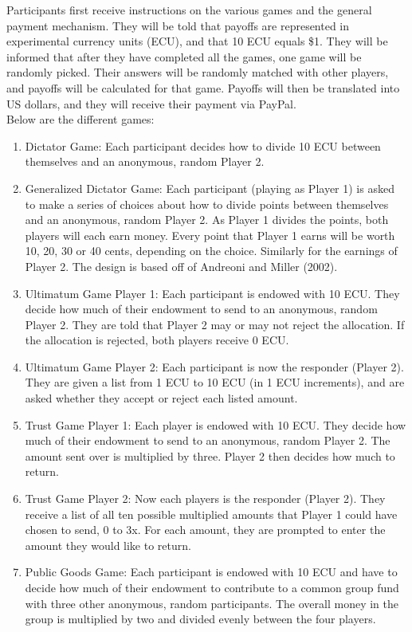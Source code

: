 \documentclass{article}
\begin{document}
Participants first receive instructions on the various games and the general payment mechanism. They will be told that payoffs are represented in experimental currency units (ECU), and that 10 ECU equals \$1. They will be informed that after they have completed all the games, one game will be randomly picked. Their answers will be randomly matched with other players, and payoffs will be calculated for that game. Payoffs will then be translated into US dollars, and they will receive their payment via PayPal.\\

Below are the different games: \\

\begin{enumerate}

\item Dictator Game: Each participant decides how to divide 10 ECU between themselves and an anonymous, random Player 2.
\item Generalized Dictator Game:  Each participant (playing as Player 1)  is asked to make a series of choices about how to divide points between themselves and an anonymous, random Player 2. As Player 1 divides the points, both players will each earn money. Every point that Player 1 earns will be worth 10, 20, 30 or 40 cents, depending on the choice. Similarly for the earnings of Player 2. The design is based off of Andreoni and Miller (2002).
\item Ultimatum Game Player 1: Each participant is endowed with 10 ECU. They decide how much of their endowment to send to an anonymous, random Player 2. They are told that Player 2 may or may not reject the allocation. If the allocation is rejected, both players receive 0 ECU.
\item Ultimatum Game Player  2: Each participant is now the responder (Player 2). They are given a list from 1 ECU to 10 ECU (in 1 ECU increments), and are asked whether they accept or reject each listed amount.
\item Trust Game Player 1: Each player is endowed with 10 ECU. They decide how much of their endowment to send to an anonymous, random Player 2. The amount sent over is multiplied by three. Player 2 then decides how much to return. 
\item Trust Game Player 2: Now each players is the responder (Player 2). They receive a list of all ten possible multiplied amounts that Player 1 could have chosen to send, 0 to 3x. For each amount, they are prompted to enter the amount they would like to return.
\item Public Goods Game: Each participant is endowed with 10 ECU and have to decide how much of their endowment to contribute to a common group fund with three other anonymous, random participants. The overall money in the group is multiplied by two and divided evenly between the four players.

\end{enumerate}
\end{document}

